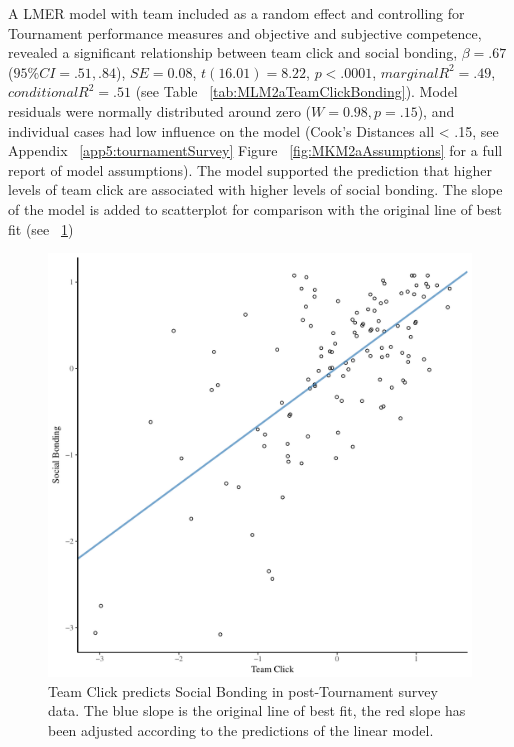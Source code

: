 \begin{landscape}
 A LMER model with team included as a random effect and controlling for Tournament performance measures and objective and subjective competence, revealed a significant relationship between team click and social bonding, $\beta = .67$ ($95\% CI =  .51, .84$), $SE = 0.08$, $t(16.01) = 8.22$, $p < .0001$, $marginal R^2 = .49$, $conditional R^2 = .51$ (see Table ~\ref{tab:MLM2aTeamClickBonding}).  Model residuals were normally distributed around zero ($W = 0.98, p = .15$), and individual cases had low influence on the model (Cook's Distances all < .15, see Appendix ~\ref{app5:tournamentSurvey} Figure ~\ref{fig:MKM2aAssumptions} for a full report of model assumptions).  The model supported the prediction that higher levels of team click are associated with higher levels of social bonding.
 The slope of the model is added to scatterplot for comparison with the original line of best fit (see ~\ref{fig:clickBondModelSlope})

  

  \begin{figure}[htbp]
  \includegraphics[width = \linewidth]{images/clickBondModelSlope.pdf}
    \caption{Team Click predicts Social Bonding in post-Tournament survey data. The blue slope is the original line of best fit, the red slope has been adjusted according to the predictions of the linear model.}
    \label{fig:clickBondModelSlope}
  \end{figure}




\end{landscape}
